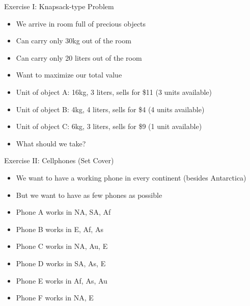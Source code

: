 \documentclass[11pt,aspectratio=169,handout]{beamer}
\begin{document}
  \begin{frame}{Exercise I: Knapsack-type Problem}
   \begin{itemize}
    \item We arrive in room full of precious objects
    \item Can carry only 30kg out of the room
    \item Can carry only 20 liters out of the room
    \item Want to maximize our total value
    \item Unit of object A: 16kg, 3 liters, sells for \$11 (3 units available)
    \item Unit of object B: 4kg, 4 liters, sells for \$4 (4 units available)
    \item Unit of object C: 6kg, 3 liters, sells for \$9 (1 unit available)
    \item What should we take?
   \end{itemize}
  \end{frame}
 
  \begin{frame}{Exercise II: Cellphones (Set Cover)}
   \begin{itemize}
    \item We want to have a working phone in every continent (besides Antarctica) 
    \item But we want to have as few phones as possible
    \item Phone A works in NA, SA, Af
    \item Phone B works in E, Af, As
    \item Phone C works in NA, Au, E
    \item Phone D works in SA, As, E
    \item Phone E works in Af, As, Au
    \item Phone F works in NA, E
   \end{itemize}
  \end{frame}
 
\end{document}
